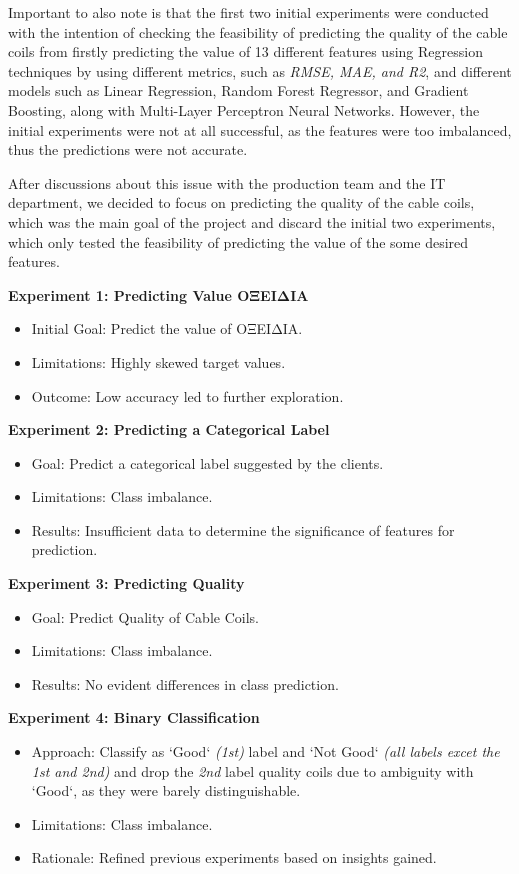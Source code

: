Important to also note is that the first two initial experiments were conducted
with the intention of checking the feasibility of predicting the quality of the
cable coils from firstly predicting the value of 13 different features using
Regression techniques by using different metrics, such as \emph{RMSE, MAE, and
    R2}, and different models such as Linear Regression, Random Forest Regressor,
and Gradient Boosting, along with Multi-Layer Perceptron Neural Networks.
However, the initial experiments were not at all successful, as the features
were too imbalanced, thus the predictions were not accurate.

After discussions about this issue with the production team and the IT
department, we decided to focus on predicting the quality of the cable coils,
which was the main goal of the project and discard the initial two experiments,
which only tested the feasibility of predicting the value of the some desired
features.

\textbf{Experiment 1: Predicting Value ΟΞΕΙΔΙΑ}
\begin{itemize}
    \item Initial Goal: Predict the value of ΟΞΕΙΔΙΑ.
    \item Limitations: Highly skewed target values.
    \item Outcome: Low accuracy led to further exploration.
\end{itemize}

\textbf{Experiment 2: Predicting a Categorical Label}
\begin{itemize}
    \item Goal: Predict a categorical label suggested by the clients.
    \item Limitations: Class imbalance.
    \item Results: Insufficient data to determine the significance of features for
          prediction.
\end{itemize}

\textbf{Experiment 3: Predicting Quality}
\begin{itemize}
    \item Goal: Predict Quality of Cable Coils.
    \item Limitations: Class imbalance.
    \item Results: No evident differences in class prediction.
\end{itemize}

\textbf{Experiment 4: Binary Classification}
\begin{itemize}
    \item Approach: Classify as `Good` \emph{(1st)} label and `Not Good` \emph{(all
              labels excet the 1st and 2nd)} and drop the \emph{2nd} label quality coils due
          to ambiguity with `Good`, as they were barely distinguishable.
    \item Limitations: Class imbalance.
    \item Rationale: Refined previous experiments based on insights gained.
\end{itemize}

